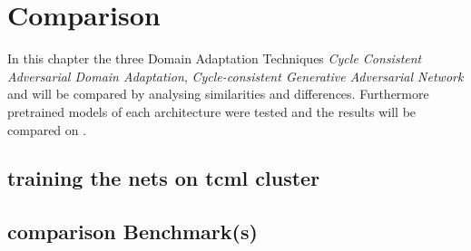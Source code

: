 \chapter{Comparison}
\label{sec:comparison}

In this chapter the three Domain Adaptation Techniques \textit{Cycle Consistent Adversarial Domain Adaptation}, \textit{Cycle-consistent Generative Adversarial Network} and  will be compared by analysing similarities and differences. Furthermore pretrained models of each architecture were tested and the results will be compared on .

\section{training the nets on tcml cluster} 

\section{comparison Benchmark(s)}

